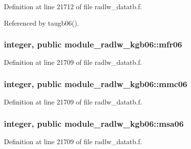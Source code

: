 Definition at line 21712 of file radlw\+\_\+datatb.\+f.



Referenced by taugb06().

\subsubsection[{\texorpdfstring{mfr06}{mfr06}}]{\setlength{\rightskip}{0pt plus 5cm}integer, public module\+\_\+radlw\+\_\+kgb06\+::mfr06}\hypertarget{namespacemodule__radlw__kgb06_aaf1f13cdb5c2888b416a91e8b17e41d8}{}\label{namespacemodule__radlw__kgb06_aaf1f13cdb5c2888b416a91e8b17e41d8}


Definition at line 21709 of file radlw\+\_\+datatb.\+f.

\subsubsection[{\texorpdfstring{mmc06}{mmc06}}]{\setlength{\rightskip}{0pt plus 5cm}integer, public module\+\_\+radlw\+\_\+kgb06\+::mmc06}\hypertarget{namespacemodule__radlw__kgb06_af7a377cb66fd48348789c20f5a31dec6}{}\label{namespacemodule__radlw__kgb06_af7a377cb66fd48348789c20f5a31dec6}


Definition at line 21709 of file radlw\+\_\+datatb.\+f.

\subsubsection[{\texorpdfstring{msa06}{msa06}}]{\setlength{\rightskip}{0pt plus 5cm}integer, public module\+\_\+radlw\+\_\+kgb06\+::msa06}\hypertarget{namespacemodule__radlw__kgb06_add7b5d0d3ea44e1e677948c33e870333}{}\label{namespacemodule__radlw__kgb06_add7b5d0d3ea44e1e677948c33e870333}


Definition at line 21709 of file radlw\+\_\+datatb.\+f.


